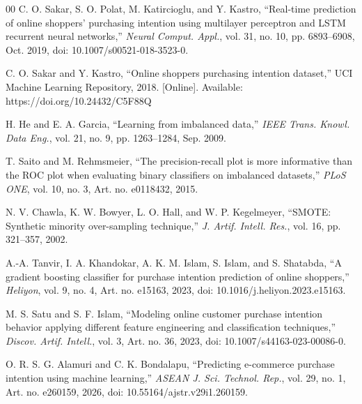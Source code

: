 \documentclass[conference]{IEEEtran}
\begin{document}
\begin{thebibliography}{00}
C. O. Sakar, S. O. Polat, M. Katircioglu, and Y. Kastro, ``Real-time prediction of online shoppers' purchasing intention using multilayer perceptron and LSTM recurrent neural networks,'' \emph{Neural Comput. Appl.}, vol. 31, no. 10, pp. 6893--6908, Oct. 2019, doi: 10.1007/s00521-018-3523-0.

C. O. Sakar and Y. Kastro, ``Online shoppers purchasing intention dataset,'' UCI Machine Learning Repository, 2018. [Online]. Available: https://doi.org/10.24432/C5F88Q

H. He and E. A. Garcia, ``Learning from imbalanced data,'' \emph{IEEE Trans. Knowl. Data Eng.}, vol. 21, no. 9, pp. 1263--1284, Sep. 2009.

T. Saito and M. Rehmsmeier, ``The precision-recall plot is more informative than the ROC plot when evaluating binary classifiers on imbalanced datasets,'' \emph{PLoS ONE}, vol. 10, no. 3, Art. no. e0118432, 2015.

N. V. Chawla, K. W. Bowyer, L. O. Hall, and W. P. Kegelmeyer, ``SMOTE: Synthetic minority over-sampling technique,'' \emph{J. Artif. Intell. Res.}, vol. 16, pp. 321--357, 2002.

A.-A. Tanvir, I. A. Khandokar, A. K. M. Islam, S. Islam, and S. Shatabda, ``A gradient boosting classifier for purchase intention prediction of online shoppers,'' \emph{Heliyon}, vol. 9, no. 4, Art. no. e15163, 2023, doi: 10.1016/j.heliyon.2023.e15163.

M. S. Satu and S. F. Islam, ``Modeling online customer purchase intention behavior applying different feature engineering and classification techniques,'' \emph{Discov. Artif. Intell.}, vol. 3, Art. no. 36, 2023, doi: 10.1007/s44163-023-00086-0.

O. R. S. G. Alamuri and C. K. Bondalapu, ``Predicting e-commerce purchase intention using machine learning,'' \emph{ASEAN J. Sci. Technol. Rep.}, vol. 29, no. 1, Art. no. e260159, 2026, doi: 10.55164/ajstr.v29i1.260159.
\end{thebibliography}
\end{document}
